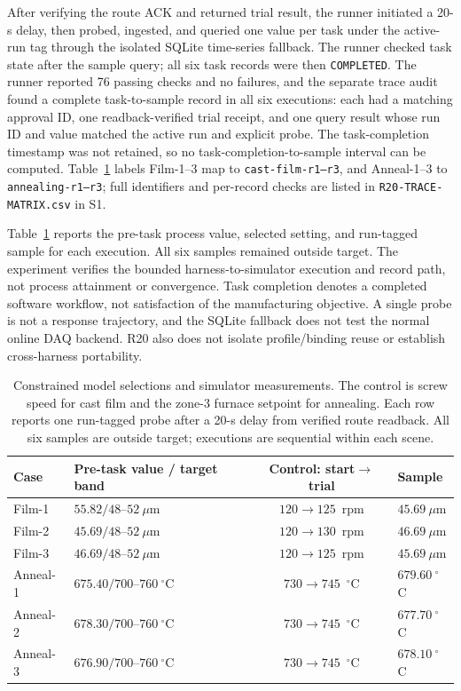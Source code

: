 After verifying the route ACK and returned trial result, the runner initiated
a 20-s delay, then probed, ingested, and queried one value per task under the
active-run tag through the isolated SQLite time-series fallback. The runner
checked task state after the sample query; all six task records were then
\texttt{COMPLETED}. The runner reported 76 passing checks and no failures, and
the separate trace audit found a complete task-to-sample record in all six
executions: each had a matching approval ID, one readback-verified trial
receipt, and one query result whose run ID and value matched the active run and
explicit probe. The task-completion timestamp was not retained, so no
task-completion-to-sample interval can be computed. Table~\ref{tab:q8} labels
Film-1--3 map to \texttt{cast-film-r1--r3}, and Anneal-1--3 to
\texttt{annealing-r1--r3}; full identifiers and per-record checks are listed
in \texttt{R20-TRACE-MATRIX.csv} in S1.

Table~\ref{tab:q8} reports the pre-task process value, selected setting, and
run-tagged sample for each execution. All six samples remained outside target.
The experiment verifies the bounded harness-to-simulator execution and record
path, not process attainment or convergence. Task completion denotes a
completed software workflow, not satisfaction of the manufacturing objective.
A single probe is not a response trajectory, and the SQLite fallback does not
test the normal online DAQ backend. R20 also does not isolate
profile/binding reuse or establish cross-harness portability.

\begin{table}[!t]
\centering
\caption{Constrained model selections and simulator measurements. The control
is screw speed for cast film and the zone-3 furnace setpoint for annealing.
Each row reports one run-tagged probe after a 20-s delay from verified route
readback. All six samples are outside target; executions are sequential within
each scene.}
\label{tab:q8}
\footnotesize
\setlength{\tabcolsep}{2.5pt}
\begin{tabularx}{\columnwidth}{@{}lXcX@{}}
\toprule
Case & Pre-task value / target band & Control: start$\to$trial & Sample \\
\midrule
Film-1 & $55.82/48$--$52~\mu$m & $120\to125$~rpm & $45.69~\mu$m \\
Film-2 & $45.69/48$--$52~\mu$m & $120\to130$~rpm & $46.69~\mu$m \\
Film-3 & $46.69/48$--$52~\mu$m & $120\to125$~rpm & $45.69~\mu$m \\
Anneal-1 & $675.40/700$--$760~^{\circ}$C & $730\to745$~$^{\circ}$C & $679.60~^{\circ}$C \\
Anneal-2 & $678.30/700$--$760~^{\circ}$C & $730\to745$~$^{\circ}$C & $677.70~^{\circ}$C \\
Anneal-3 & $676.90/700$--$760~^{\circ}$C & $730\to745$~$^{\circ}$C & $678.10~^{\circ}$C \\
\bottomrule
\end{tabularx}
\end{table}

